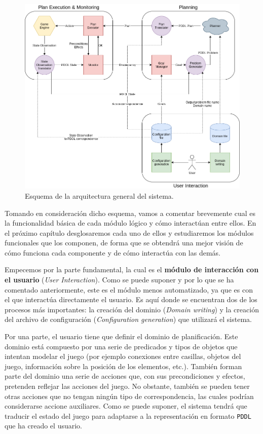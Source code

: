 \begin{figure}[H]
    \centering
    \includegraphics[scale=0.4]{img/CH04/system_arch.png}
    \caption{Esquema de la arquitectura general del sistema.}
    \label{fig:system_arch}
\end{figure}

Tomando en consideración dicho esquema, vamos a comentar brevemente cual es
la funcionalidad básica de cada módulo lógico y cómo interactúan entre ellos.
En el próximo capítulo desglosaremos cada uno de ellos y estudiaremos los módulos
funcionales que los componen, de forma que se obtendrá una mejor visión de cómo
funciona cada componente y de cómo interactúa con las demás.

Empecemos por la parte fundamental, la cual es el \textbf{módulo de interacción con el usuario}
(\textit{User Interaction}). Como se puede suponer y por lo que se ha comentado anteriormente,
este es el módulo menos automatizado, ya que es con el que interactúa directamente el usuario.
Es aquí donde se encuentran dos de los procesos más importantes: la creación del dominio
(\textit{Domain writing}) y la creación del archivo de configuración
(\textit{Configuration generation}) que utilizará el sistema.

Por una parte, el usuario tiene que definir el dominio de planificación. Este dominio está
compuesto por una serie de predicados y tipos de objetos que intentan modelar el
juego (por ejemplo conexiones entre casillas, objetos del juego, información sobre la
posición de los elementos, etc.). También forman parte del dominio una serie de acciones
que, con sus precondiciones y efectos, pretenden reflejar las acciones del juego. No obstante,
también se pueden tener otras acciones que no tengan ningún tipo de correspondencia, las cuales
podrían considerarse accione auxiliares. Como se puede suponer, el sistema tendrá que traducir
el estado del juego para adaptarse a la representación en formato \texttt{PDDL} que ha
creado el usuario.

